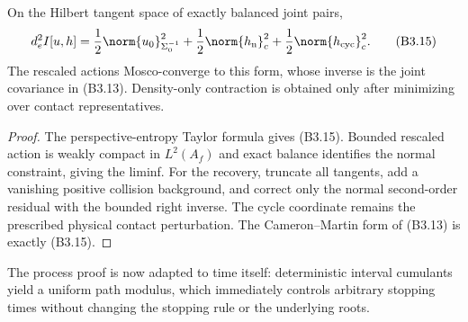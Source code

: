\begin{theorem}
\label{thm:r31-b3-mosco}
On the Hilbert tangent space of exactly balanced joint pairs,
\[
 d_e^2I[u,h]
 ={1\over2}\norm{u_0}_{\Sigma_0^{-1}}^2
 +{1\over2}\norm{h_{\rm n}}_c^2
 +{1\over2}\norm{h_{\rm cyc}}_c^2.                      \tag{B3.15}
\]
The rescaled actions Mosco-converge to this form, whose inverse is the joint
covariance in (B3.13).  Density-only contraction is obtained only after
minimizing over contact representatives.
\end{theorem}

\begin{proof}
The perspective-entropy Taylor formula gives (B3.15).  Bounded rescaled action
is weakly compact in $L^2(A_f)$ and exact balance identifies the normal
constraint, giving the liminf.  For the recovery, truncate all tangents, add a
vanishing positive collision background, and correct only the normal
second-order residual with the bounded right inverse.  The cycle coordinate
remains the prescribed physical contact perturbation.  The Cameron--Martin
form of (B3.13) is exactly (B3.15).
\end{proof}

The process proof is now adapted to time itself: deterministic interval
cumulants yield a uniform path modulus, which immediately controls arbitrary
stopping times without changing the stopping rule or the underlying roots.

